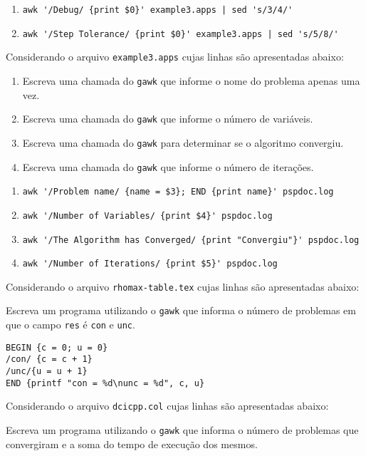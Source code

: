 \begin{Answer}[ref={0004}]
  \begin{enumerate}
    \item \verb+awk '/Debug/ {print $0}' example3.apps | sed 's/3/4/'+
    \item \verb+awk '/Step Tolerance/ {print $0}' example3.apps | sed 's/5/8/'+
  \end{enumerate}
\end{Answer}
\begin{Exercise}[label={0005}, difficulty={1}, origin={gawk}]
  Considerando o arquivo \verb+example3.apps+ cujas linhas são
  apresentadas abaixo:
  
  \begin{enumerate}
    \item Escreva uma chamada do \verb+gawk+ que informe o nome do
      problema apenas uma vez.
    \item Escreva uma chamada do \verb+gawk+ que informe o número de
      variáveis.
    \item Escreva uma chamada do \verb+gawk+ para determinar se o algoritmo
      convergiu.
    \item Escreva uma chamada do \verb+gawk+ que informe o número de
      iterações.
  \end{enumerate}
\end{Exercise}

\begin{Answer}[ref={0005}]
  \begin{enumerate}
    \item \verb+awk '/Problem name/ {name = $3}; END {print name}' pspdoc.log+
    \item \verb+awk '/Number of Variables/ {print $4}' pspdoc.log+
    \item \verb+awk '/The Algorithm has Converged/ {print "Convergiu"}' pspdoc.log+
    \item \verb+awk '/Number of Iterations/ {print $5}' pspdoc.log+
  \end{enumerate}
\end{Answer}
\begin{Exercise}[label={0006}, difficulty={2}, origin={gawk}]
  Considerando o arquivo \verb+rhomax-table.tex+ cujas linhas são
  apresentadas abaixo:
  
  Escreva um programa utilizando o \verb+gawk+ que informa o número de
  problemas em que o campo \verb+res+ é \verb+con+ e \verb+unc+.
\end{Exercise}

\begin{Answer}[ref={0006}]
  \begin{lstlisting}
BEGIN {c = 0; u = 0}
/con/ {c = c + 1}
/unc/{u = u + 1}
END {printf "con = %d\nunc = %d", c, u}
  \end{lstlisting}
\end{Answer}
\begin{Exercise}[label={0007}, difficulty={2}, origin={gawk}]
  Considerando o arquivo \verb+dcicpp.col+ cujas linhas são
  apresentadas abaixo:
  
  Escreva um programa utilizando o \verb+gawk+ que informa o número de
  problemas que convergiram e a soma do tempo de execução dos mesmos.
\end{Exercise}

